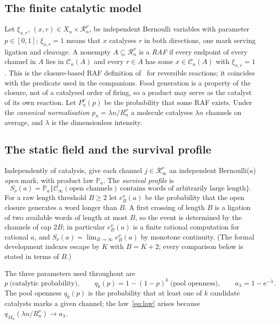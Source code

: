 \documentclass[11pt,a4paper]{article}
\theoremstyle{plain}
\theoremstyle{definition}
\theoremstyle{remark}
\newcommand{\Prob}{\mathbb{P}}
\newcommand{\cl}{\mathcal{C}}
\newcommand{\ee}{\mathrm{e}}
\newcommand{\R}{\mathcal{R}}
\begin{document}
\subsection{The finite catalytic model}
Let $\xi_{x,r}$, $(x,r)\in X_n\times\R_n^\nu$, be independent Bernoulli variables with parameter $p\in[0,1]$; $\xi_{x,r}=1$ means that $x$ catalyses $r$ in both directions, one mark serving ligation and cleavage. A nonempty $A\subseteq\R_n^\nu$ is a \emph{RAF} if every endpoint of every channel in $A$ lies in $\cl_n(A)$ and every $r\in A$ has some $x\in\cl_n(A)$ with $\xi_{x,r}=1$. This is the closure-based RAF definition of~\cite{hordijk2004detecting,hordijk2011required} for reversible reactions; it coincides with the predicate used in the companions. Food generation is a property of the closure, not of a catalysed order of firing, so a product may serve as the catalyst of its own reaction. Let $P_n^\nu(p)$ be the probability that some RAF exists. Under the \emph{canonical normalisation} $p_n=\lambda n/R_n^\nu$ a molecule catalyses $\lambda n$ channels on average, and $\lambda$ is the dimensionless intensity.

\subsection{The static field and the survival profile}
Independently of catalysis, give each channel $j\in\R_\infty^\nu$ an independent Bernoulli($a$) \emph{open} mark, with product law $\Prob_a$. The \emph{survival profile} is
\begin{equation}\label{eq:survival}
S_\nu(a)=\Prob_a\{\cl_\infty(\text{open channels})\ \text{contains words of arbitrarily large length}\}.
\end{equation}
For a raw length threshold $B\ge2$ let $e^\nu_B(a)$ be the probability that the open closure generates a word longer than $B$. A first crossing of length $B$ is a ligation of two available words of length at most $B$, so the event is determined by the channels of cap $2B$; in particular $e^\nu_B(a)$ is a finite rational computation for rational $a$, and $S_\nu(a)=\lim_{B\to\infty}e^\nu_B(a)$ by monotone continuity. (The formal development indexes escape by $K$ with $B=K+2$; every comparison below is stated in terms of $B$.)

The three parameters used throughout are
\begin{equation}\label{eq:parameters}
p\ \text{(catalytic probability)},\qquad q_k(p)=1-(1-p)^k\ \text{(pool openness)},\qquad a_\lambda=1-\ee^{-\lambda}.
\end{equation}
The pool openness $q_k(p)$ is the probability that at least one of $k$ candidate catalysts marks a given channel; the law~\eqref{eq:law} arises because $q_{M_n}(\lambda n/R_n^\nu)\to a_\lambda$.
\end{document}
